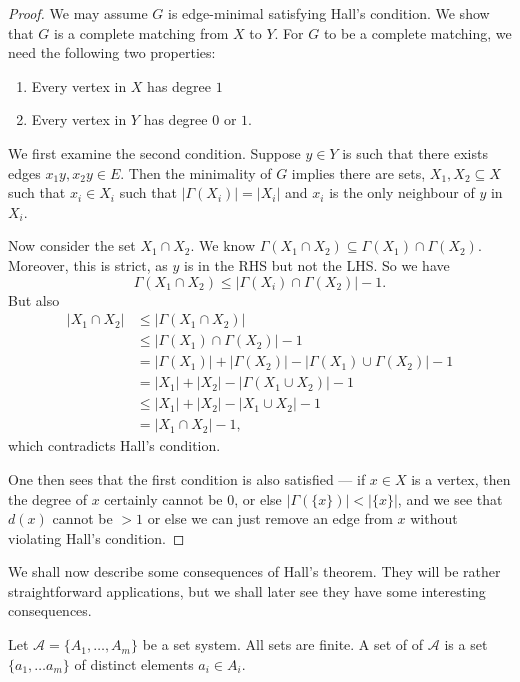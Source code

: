 \documentclass[a4paper]{article}
\begin{document}
\begin{proof}
  We may assume $G$ is edge-minimal satisfying Hall's condition. We show that $G$ is a complete matching from $X$ to $Y$. For $G$ to be a complete matching, we need the following two properties:
  \begin{enumerate}
    \item Every vertex in $X$ has degree $1$
    \item Every vertex in $Y$ has degree $0$ or $1$.
  \end{enumerate}

  We first examine the second condition. Suppose $y \in Y$ is such that there exists edges $x_1 y, x_2 y \in E$. Then the minimality of $G$ implies there are sets, $X_1, X_2 \subseteq X$ such that $x_i \in X_i$ such that $|\Gamma(X_i)| = |X_i|$ and $x_i$ is the only neighbour of $y$ in $X_i$.

  Now consider the set $X_1 \cap X_2$. We know $\Gamma(X_1 \cap X_2) \subseteq \Gamma(X_1) \cap \Gamma(X_2)$. Moreover, this is strict, as $y$ is in the RHS but not the LHS. So we have
  \[
    \Gamma(X_1 \cap X_2) \leq |\Gamma(X_i) \cap \Gamma(X_2)| - 1.
  \]
  But also
  \begin{align*}
    |X_1 \cap X_2| &\leq |\Gamma(X_1 \cap X_2)|\\
    &\leq |\Gamma(X_1) \cap \Gamma(X_2)| - 1 \\
    &= |\Gamma(X_1)| + |\Gamma(X_2)| - |\Gamma(X_1) \cup \Gamma(X_2)| - 1\\
    &= |X_1| + |X_2| - |\Gamma(X_1\cup X_2)| - 1\\
    &\leq |X_1| + |X_2| - |X_1 \cup X_2| - 1\\
    &= |X_1 \cap X_2| - 1,
  \end{align*}
  which contradicts Hall's condition.

  One then sees that the first condition is also satisfied --- if $x \in X$ is a vertex, then the degree of $x$ certainly cannot be $0$, or else $|\Gamma(\{x\})| < |\{x\}|$, and we see that $d(x)$ cannot be $>1$ or else we can just remove an edge from $x$ without violating Hall's condition.
\end{proof}

We shall now describe some consequences of Hall's theorem. They will be rather straightforward applications, but we shall later see they have some interesting consequences.

Let $\mathcal{A} = \{A_1, \ldots, A_m\}$ be a set system. All sets are finite. A set of  of $\mathcal{A}$ is a set $\{a_1, \ldots a_m\}$ of distinct elements $a_i \in A_i$.
\end{document}
